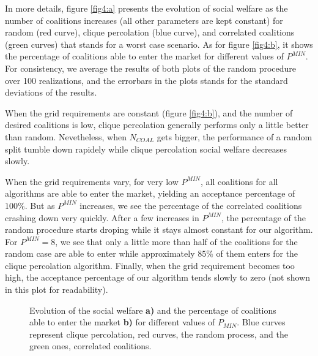 \documentclass[conference]{IEEEtran}
\begin{document}
In more details, figure \ref{fig4:a} presents the evolution of social welfare as the number of coalitions increases (all other parameters are kept constant) for random (red curve), clique percolation (blue curve), and correlated coalitions (green curves) that stands for a worst case scenario. As for figure \ref{fig4:b}, it shows the percentage of coalitions able to enter the market for different values of $ P^{MIN} $. For consistency, we average the results of both plots of the random procedure over 100 realizations, and the errorbars in the plots stands for the standard deviations of the results.

When the grid requirements are constant (figure \ref{fig4:b}), and the number of desired coalitions is low, clique percolation generally performs only a little better than random. Nevetheless, when $ N_{COAL} $ gets bigger, the performance of a random split tumble down rapidely while clique percolation social welfare decreases slowly.

When the grid requirements vary, for very low $ P^{MIN} $, all coalitions for all algorithms are able to enter the market, yielding an acceptance percentage of $ 100 \% $. But as $ P^{MIN} $ increases, we see the percentage of the correlated coalitions crashing down very quickly. After a few increases in $ P^{MIN} $, the percentage of the random procedure starts droping while it stays almost constant for our algorithm. For $ P^{MIN} = 8 $, we see that only a little more than half of the coalitions for the random case are able to enter while approximately $ 85 \%$ of them enters for the clique percolation algorithm. Finally, when the grid requirement becomes too high, the acceptance percentage of our algorithm tends slowly to zero (not shown in this plot for readability).


\begin{figure}
 \centering
  \hspace{1em}%
\caption{Evolution of the social welfare \textbf{a)} and the percentage of coalitions able to enter the market \textbf{b)} for different values of $ P_{MIN} $. Blue curves represent clique percolation, red curves, the random process, and the green ones, correlated coalitions.}
\label{Fig4}
\end{figure}
\end{document}
